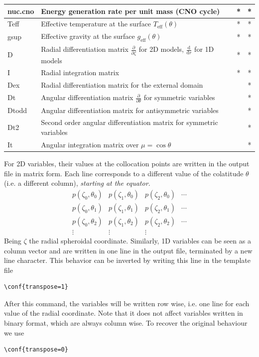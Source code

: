 \begin{longtable}{|l|p{8cm}|c|c|}
\hline
nuc.cno&Energy generation rate per unit mass (CNO cycle)&*&*\\
\hline
Teff&Effective temperature at the surface $T_\mathrm{eff}(\theta)$&*&*\\
\hline
gsup&Effective gravity at the surface $g_\mathrm{eff}(\theta)$&*&*\\
\hline
D&Radial differentiation matrix $\frac{\partial}{\partial\zeta}$ for 2D models,
$\frac{\mathrm{d}}{\mathrm{d}r}$ for 1D models&*&*\\
\hline
I&Radial integration matrix&*&*\\
\hline
Dex&Radial differentiation matrix for the external domain&&*\\
\hline
Dt&Angular differentiation matrix $\frac{\partial}{\partial\theta}$ for symmetric variables&&*\\
\hline
Dtodd&Angular differentiation matrix for antisymmetric variables&&*\\
\hline
Dt2&Second order angular differentiation matrix for symmetric variables&&*\\
\hline
It&Angular integration matrix over $\mu=\cos\theta$ &&*\\
\hline
\end{longtable}
For 2D variables, their values at the collocation points are written in the output file
in matrix form. Each line corresponds to a different value of the colatitude $\theta$
(i.e. a different column), {\em starting at the equator.}
$$\begin{array}{cccc}
p(\zeta_0,\theta_0)&p(\zeta_1,\theta_0)&p(\zeta_2,\theta_0)&\cdots\\
p(\zeta_0,\theta_1)&p(\zeta_1,\theta_1)&p(\zeta_2,\theta_1)&\cdots\\
p(\zeta_0,\theta_2)&p(\zeta_1,\theta_2)&p(\zeta_2,\theta_2)&\cdots\\
\vdots&\vdots&\vdots&
\end{array}$$
Being $\zeta$ the radial spheroidal coordinate.
Similarly, 1D variables can be seen as a column vector and are written in one line in the
output file, terminated by a new line character.
This behavior can be inverted by writing this line in the template file
\begin{verbatim}
\conf{transpose=1}
\end{verbatim}
After this command, the variables will be written row wise, i.e. one line for each value of
the radial coordinate. Note that it does not affect variables written in binary format,
which are always column wise. To recover the original behaviour we use
\begin{verbatim}
\conf{transpose=0}
\end{verbatim}


